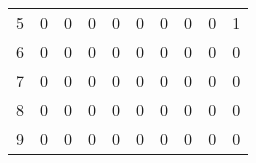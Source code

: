 \begin{table}[]
\begin{tabular}{|c|ccccccccc|}
\rowcolor[HTML]{FFFFFF} 
5                         & 0                                              & 0                                              & 0                                              & 0                                              & 0                                              & 0                                              & 0                                              & 0                                              & \cellcolor[HTML]{34CDF9}1 \\ \cline{1-1}
\rowcolor[HTML]{FFFFFF} 
6                         & 0                                              & 0                                              & 0                                              & 0                                              & 0                                              & 0                                              & 0                                              & 0                                              & 0                         \\ \cline{1-1}
\rowcolor[HTML]{FFFFFF} 
7                         & 0                                              & 0                                              & 0                                              & 0                                              & 0                                              & 0                                              & 0                                              & 0                                              & 0                         \\ \cline{1-1}
\rowcolor[HTML]{FFFFFF} 
8                         & 0                                              & 0                                              & 0                                              & 0                                              & 0                                              & 0                                              & 0                                              & 0                                              & 0                         \\ \cline{1-1}
\rowcolor[HTML]{FFFFFF} 
9                         & 0                                              & 0                                              & 0                                              & 0                                              & 0                                              & 0                                              & 0                                              & 0                                              & 0                         \\ \hline
\end{tabular}
\end{table}
	  

